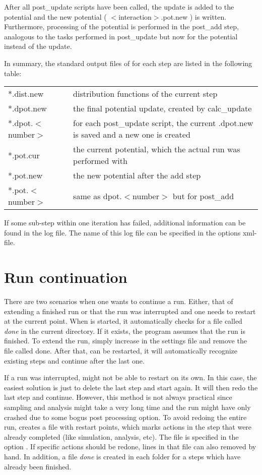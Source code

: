 After all post\_update scripts have been called, the update is added to the potential and the new potential ( $<$interaction$>$.pot.new ) is written. Furthermore, processing of the potential is performed in the post\_add step, analogous to the tasks performed in post\_update but now for the potential instead of the update.

In summary, the standard output files of \votca for each step are listed in the following table:

\begin{tabular}{ll}
*.dist.new & distribution functions of the current step \\
*.dpot.new & the final potential update, created by calc\_update \\
*.dpot.$<$number$>$ & for each post\_update script, the current .dpot.new is saved and a new one is created\\
*.pot.cur & the current potential, which the actual run was performed with \\
*.pot.new & the new potential after the add step \\
*.pot.$<$number$>$ & same as dpot.$<$number$>$ but for post\_add
\end{tabular}

If some sub-step within one iteration has failed, additional information can be found in the log file. The name of this log file can be specified in the options xml-file.

\section{Run continuation}
There are two scenarios when one wants to continue a run. Either, that of extending a finished run or that the run was interrupted and one needs to restart at the current point. When  is started, it automatically checks for a file called \textit{done} in the current directory. If it exists, the program assumes that the run is finished. To extend the run, simply increase  in the settings file and remove the file called done. After that,  can be restarted, it will automatically recognize existing steps and continue after the last one.

If a run was interrupted,  might not be able to restart on its own. In this case, the easiest solution is just to delete the last step and start again. It will then redo the last step and continue. However, this method is not always practical since sampling and analysis might take a very long time and the run might have only crashed due to some bogus post processing option. To avoid redoing the entire run,  creates a file with restart points, which marks actions in the step that were already completed (like simulation, analysis, etc). The file is specified in the option . If specific actions should be redone, lines in that file can also removed by hand. In addition, a file \textit{done} is created in each folder for a steps which have already been finished.

